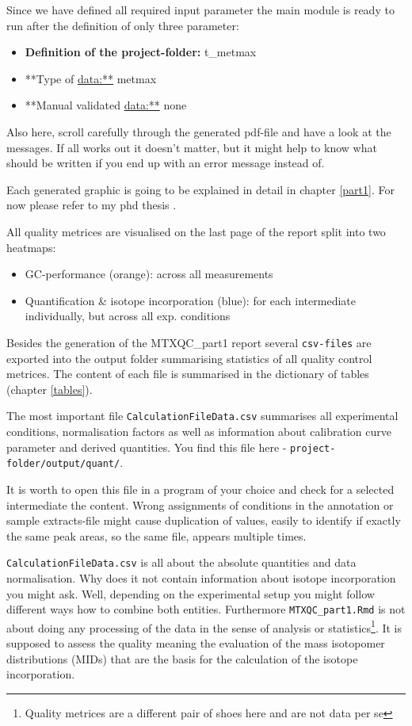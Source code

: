 \documentclass[]{book}
\providecommand{\tightlist}{%
  \setlength{\itemsep}{0pt}\setlength{\parskip}{0pt}}
\let\rmarkdownfootnote\footnote%
\def\footnote{\protect\rmarkdownfootnote}
\theoremstyle{definition}
\theoremstyle{definition}
\theoremstyle{definition}
\theoremstyle{remark}
\begin{document}
Since we have defined all required input parameter the main module is
ready to run after the definition of only three parameter:

\begin{itemize}
\tightlist
\item
  \textbf{Definition of the project-folder:} t\_metmax
\item
  **Type of \url{data:**} metmax
\item
  **Manual validated \url{data:**} none
\end{itemize}

Also here, scroll carefully through the generated pdf-file and have a
look at the messages. If all works out it doesn't matter, but it might
help to know what should be written if you end up with an error message
instead of.

Each generated graphic is going to be explained in detail in chapter
\ref{part1}. For now please refer to my phd thesis \citep{Zasada2017}.

All quality metrices are visualised on the last page of the report split
into two heatmaps:

\begin{itemize}
\tightlist
\item
  GC-performance (orange): across all measurements
\item
  Quantification \& isotope incorporation (blue): for each intermediate
  individually, but across all exp. conditions
\end{itemize}

Besides the generation of the MTXQC\_part1 report several
\texttt{csv-files} are exported into the output folder summarising
statistics of all quality control metrices. The content of each file is
summarised in the dictionary of tables (chapter \ref{tables}).

The most important file \texttt{CalculationFileData.csv} summarises all
experimental conditions, normalisation factors as well as information
about calibration curve parameter and derived quantities. You find this
file here - \texttt{project-folder/output/quant/}.

It is worth to open this file in a program of your choice and check for
a selected intermediate the content. Wrong assignments of conditions in
the annotation or sample extracts-file might cause duplication of
values, easily to identify if exactly the same peak areas, so the same
file, appears multiple times.

\texttt{CalculationFileData.csv} is all about the absolute quantities
and data normalisation. Why does it not contain information about
isotope incorporation you might ask. Well, depending on the experimental
setup you might follow different ways how to combine both entities.
Furthermore \texttt{MTXQC\_part1.Rmd} is not about doing any processing
of the data in the sense of analysis or statistics\footnote{Quality
  metrices are a different pair of shoes here and are not data per se}.
It is supposed to assess the quality meaning the evaluation of the mass
isotopomer distributions (MIDs) that are the basis for the calculation
of the isotope incorporation.
\end{document}
